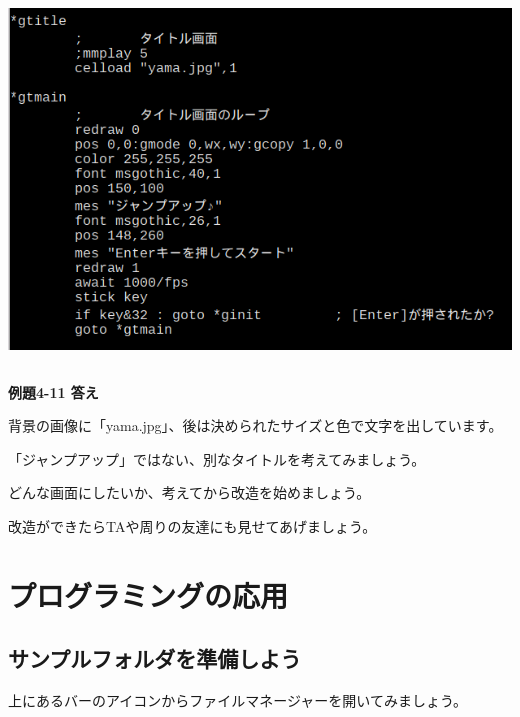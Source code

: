 \documentclass[a4paper,12pt]{jarticle}
\begin{document}
\begin{minipage}{9.781cm}
\centering
{\upshape
\includegraphics[keepaspectratio,width=14.42cm,height=9.791cm]{text04-img/text04-img033.png}}
\end{minipage}

\bigskip
\bigskip
\bigskip


{\bfseries
例題4-11 答え}


\bigskip

背景の画像に「yama.jpg」、後は決められたサイズと色で文字を出しています。

「ジャンプアップ」ではない、別なタイトルを考えてみましょう。

どんな画面にしたいか、考えてから改造を始めましょう。

\bigskip

改造ができたらTAや周りの友達にも見せてあげましょう。




\clearpage
\section{プログラミングの応用}


\subsection{サンプルフォルダを準備しよう}
\bigskip
\bigskip

上にあるバーのアイコンからファイルマネージャーを開いてみましょう。

\bigskip
\bigskip
\end{document}
